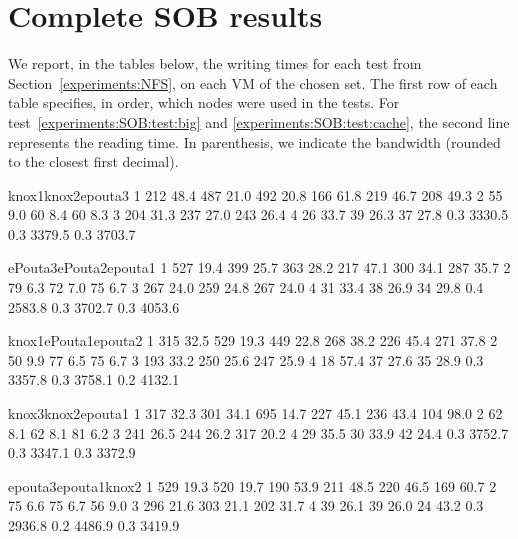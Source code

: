\section{Complete SOB results}
\label{appendix:SOB}

We report, in the tables below, the writing times for each test from
Section~\ref{experiments:NFS}, on each VM of the chosen set.
%
The first row of each table specifies, in order, which nodes were used
in the tests.
%
For test~\ref{experiments:SOB:test:big} and
\ref{experiments:SOB:test:cache}, the second line represents the
reading time. In parenthesis, we indicate the bandwidth (rounded to
the closest first decimal).%

\noindent%
\resultpartition%
{{knox1}{knox2}{epouta3}}%
{{ 1 }{ 212 }{ 48.4   }{ 487 }{ 21.0   }{ 492 }{ 20.8   }{      }}%
{{   }{ 166 }{ 61.8   }{ 219 }{ 46.7   }{ 208 }{ 49.3   }{\hline}}%
{{ 2 }{  55 }{ 9.0    }{  60 }{ 8.4    }{  60 }{ 8.3    }{\hline}}%
{{ 3 }{ 204 }{ 31.3   }{ 237 }{ 27.0   }{ 243 }{ 26.4   }{\hline}}%
{{ 4 }{  26 }{ 33.7   }{  39 }{ 26.3   }{  37 }{ 27.8   }{      }}%
{{   }{ 0.3 }{ 3330.5 }{ 0.3 }{ 3379.5 }{ 0.3 }{ 3703.7 }{      }}

\noindent%
\resultpartition%
{{ePouta3}{ePouta2}{epouta1}}%
{{ 1 }{ 527 }{ 19.4   }{ 399 }{ 25.7   }{ 363 }{ 28.2   }{      }}%
{{   }{ 217 }{ 47.1   }{ 300 }{ 34.1   }{ 287 }{ 35.7   }{\hline}}%
{{ 2 }{  79 }{ 6.3    }{  72 }{ 7.0    }{  75 }{ 6.7    }{\hline}}%
{{ 3 }{ 267 }{ 24.0   }{ 259 }{ 24.8   }{ 267 }{ 24.0   }{\hline}}%
{{ 4 }{  31 }{ 33.4   }{  38 }{ 26.9   }{  34 }{ 29.8   }{      }}%
{{   }{ 0.4 }{ 2583.8 }{ 0.3 }{ 3702.7 }{ 0.3 }{ 4053.6 }{      }}

\noindent%
\resultpartition%
{{knox1}{ePouta1}{epouta2}}%
{{ 1 }{ 315 }{ 32.5   }{ 529 }{ 19.3   }{ 449 }{ 22.8   }{      }}%
{{   }{ 268 }{ 38.2   }{ 226 }{ 45.4   }{ 271 }{ 37.8   }{\hline}}%
{{ 2 }{  50 }{ 9.9    }{  77 }{ 6.5    }{  75 }{ 6.7    }{\hline}}%
{{ 3 }{ 193 }{ 33.2   }{ 250 }{ 25.6   }{ 247 }{ 25.9   }{\hline}}%
{{ 4 }{  18 }{ 57.4   }{  37 }{ 27.6   }{  35 }{ 28.9   }{      }}%
{{   }{ 0.3 }{ 3357.8 }{ 0.3 }{ 3758.1 }{ 0.2 }{ 4132.1 }{      }}

\noindent%
\resultpartition%
{{knox3}{knox2}{epouta1}}%
{{ 1 }{ 317 }{ 32.3   }{ 301 }{ 34.1   }{ 695 }{ 14.7   }{      }}%
{{   }{ 227 }{ 45.1   }{ 236 }{ 43.4   }{ 104 }{ 98.0   }{\hline}}%
{{ 2 }{  62 }{  8.1   }{  62 }{  8.1   }{  81 }{  6.2   }{\hline}}%
{{ 3 }{ 241 }{ 26.5   }{ 244 }{ 26.2   }{ 317 }{ 20.2   }{\hline}}%
{{ 4 }{  29 }{ 35.5   }{  30 }{ 33.9   }{  42 }{ 24.4   }{      }}%
{{   }{ 0.3 }{ 3752.7 }{ 0.3 }{ 3347.1 }{ 0.3 }{ 3372.9 }{      }}

\noindent%
\resultpartition%
{{epouta3}{epouta1}{knox2}}%
{{ 1 }{ 529 }{ 19.3   }{ 520 }{ 19.7   }{ 190 }{ 53.9   }{      }}%
{{   }{ 211 }{ 48.5   }{ 220 }{ 46.5   }{ 169 }{ 60.7   }{\hline}}%
{{ 2 }{  75 }{  6.6   }{  75 }{  6.7   }{  56 }{  9.0   }{\hline}}%
{{ 3 }{ 296 }{ 21.6   }{ 303 }{ 21.1   }{ 202 }{ 31.7   }{\hline}}%
{{ 4 }{  39 }{ 26.1   }{  39 }{ 26.0   }{  24 }{ 43.2   }{      }}%
{{   }{ 0.3 }{ 2936.8 }{ 0.2 }{ 4486.9 }{ 0.3 }{ 3419.9 }{      }}

